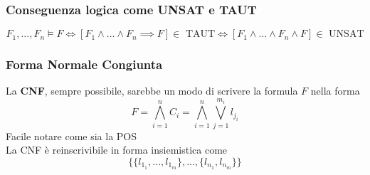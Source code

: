 \documentclass{report}
\begin{document}
        \subsubsection{Conseguenza logica come UNSAT e TAUT}
            $$F_1, ..., F_n \models F 
                \iff \left[F_1 \wedge ... \wedge F_n \implies F\right] \in \textrm{ TAUT} 
                \iff \left[F_1 \wedge ... \wedge F_n \wedge F\right] \in \textrm{ UNSAT}
            $$
        \subsubsection{Forma Normale Congiunta}
            La \textbf{CNF}, sempre possibile, sarebbe un modo di scrivere la formula 
            $F$ nella forma 
            $$F = \bigwedge_{i=1}^n C_i = \bigwedge_{i=1}^n \bigvee_{j=1}^{m_i} l_{j_i}$$
            Facile notare come sia la POS \\
            La CNF è reinscrivibile in forma insiemistica come 
            $$\{\{l_{1_1}, ..., l_{1_m}\}, ..., \{l_{n_1}, l_{n_m}\}\}$$
\end{document}
